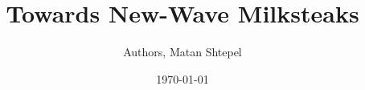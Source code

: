\documentclass[11pt,letterpaper]{article}
\theoremstyle{plain} %
\theoremstyle{definition} %
\theoremstyle{remark} %
\newcommand{\doclearpage}{%
  \iffull\clearpage\else\fi
}
\begin{document}


\title{Towards New-Wave Milksteaks}
%
\author{Authors, Matan Shtepel} %
\date{\today}


\maketitle






%

\appendix
% 

\doclearpage

\end{document}
